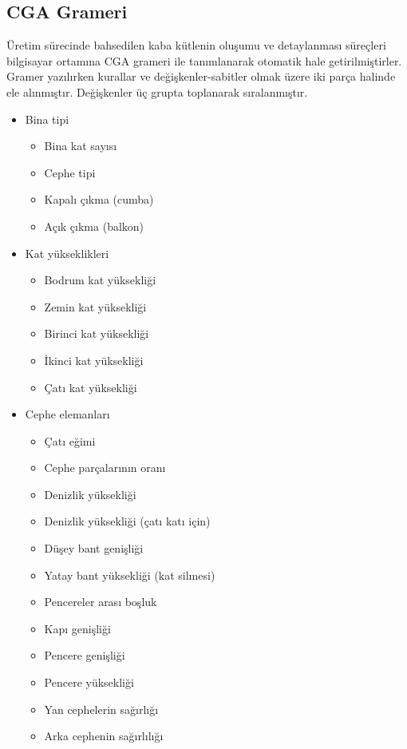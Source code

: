 \documentclass[12pt,turkish,a4paperpaper,]{report}
\providecommand{\tightlist}{%
  \setlength{\itemsep}{0pt}\setlength{\parskip}{0pt}}
\begin{document}
\hypertarget{cga-grameri}{%
\subsection{CGA Grameri}\label{cga-grameri}}

Üretim sürecinde bahsedilen kaba kütlenin oluşumu ve detaylanması
süreçleri bilgisayar ortamına CGA grameri ile tanımlanarak otomatik hale
getirilmiştirler. Gramer yazılırken kurallar ve değişkenler-sabitler
olmak üzere iki parça halinde ele alınmıştır. Değişkenler üç grupta
toplanarak sıralanmıştır.

\begin{itemize}
\tightlist
\item
  Bina tipi

  \begin{itemize}
  \tightlist
  \item
    Bina kat sayısı
  \item
    Cephe tipi
  \item
    Kapalı çıkma (cumba)
  \item
    Açık çıkma (balkon)
  \end{itemize}
\item
  Kat yükseklikleri

  \begin{itemize}
  \tightlist
  \item
    Bodrum kat yüksekliği
  \item
    Zemin kat yüksekliği
  \item
    Birinci kat yüksekliği
  \item
    İkinci kat yüksekliği
  \item
    Çatı kat yüksekliği
  \end{itemize}
\item
  Cephe elemanları

  \begin{itemize}
  \tightlist
  \item
    Çatı eğimi
  \item
    Cephe parçalarının oranı
  \item
    Denizlik yüksekliği
  \item
    Denizlik yüksekliği (çatı katı için)
  \item
    Düşey bant genişliği
  \item
    Yatay bant yüksekliği (kat silmesi)
  \item
    Pencereler arası boşluk
  \item
    Kapı genişliği
  \item
    Pencere genişliği
  \item
    Pencere yüksekliği
  \item
    Yan cephelerin sağırlığı
  \item
    Arka cephenin sağırlılığı
  \end{itemize}
\end{itemize}
\end{document}
